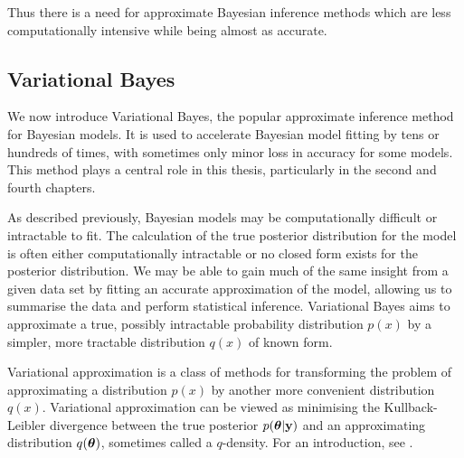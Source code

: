 Thus there is a need for approximate Bayesian inference methods which are less
computationally intensive while being almost as accurate.

 
\subsection{Variational Bayes}
\label{sec:vb}

We now introduce Variational Bayes, the popular approximate inference method for
Bayesian models. It is used to accelerate Bayesian model fitting by tens or
hundreds of times, with sometimes only minor loss in accuracy for some models.
This method plays a central role in this thesis, particularly in the second and
fourth chapters.


As described previously, Bayesian models may be computationally difficult or
intractable to fit. The calculation of the true posterior distribution for the
model is often either computationally intractable or no closed form exists for
the posterior distribution. We may be able to gain much of the same insight from
a given data set by fitting an accurate approximation  of the model, allowing us
to summarise the data and perform statistical inference. Variational Bayes aims
to approximate a true, possibly intractable probability distribution $p(x)$ by a
simpler, more tractable distribution $q(x)$ of known form.

Variational approximation is a class of methods for transforming the problem of
approximating a distribution $p(x)$ by another more convenient distribution
$q(x)$. Variational approximation can be viewed as minimising the Kullback-
Leibler divergence between the true posterior $p({\boldsymbol \theta}|{\bf y})$ and an
approximating distribution $q({\boldsymbol \theta})$, sometimes called a $q$-density. For an
introduction, see \cite{Ormerod2010}.



